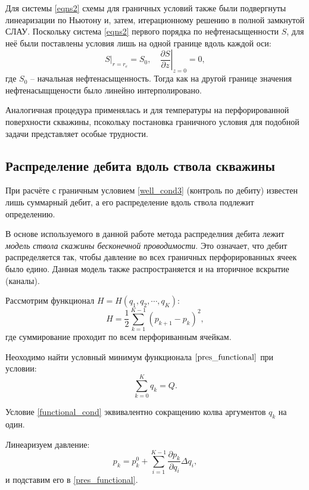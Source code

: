 	Для системы \eqref{eqns2} схемы для граничных условий также были подвергнуты линеаризации по Ньютону и, затем, итерационному решению в полной замкнутой СЛАУ.
	Поскольку система \eqref{eqns2} первого порядка по нефтенасыщенности $S$, для неё были поставлены условия лишь на одной границе вдоль каждой оси:
\begin{equation}
	\label{sat_bounds}
	\left.S\right|_{r=r_e} = S_0, \quad \left.\frac{\partial S}{\partial z}\right|_{z = 0} = 0,
\end{equation}
	где $S_0$ -- начальная нефтенасыщенность. Тогда как на другой границе значения нефтенасыщщености было линейно интерполировано.
	
	Аналогичная процедура применялась и для температуры на перфорированной поверхности скважины,  псокольку постановка граничного условия для подобной задачи представляет особые трудности.


\subsection{Распределение дебита вдоль ствола скважины}
	При расчёте с граничным условием \eqref{well_cond3} (контроль по дебиту) известен лишь суммарный дебит, а его распределение вдоль ствола подлежит определению.
	
	В основе используемого в данной работе метода распределния дебита лежит \textit{модель ствола скажины бесконечной проводимости}. 
	Это означает, что дебит распределяется так, чтобы давление во всех граничных перфорированных ячеек было едино.	
	Данная модель также распространяется и на вторичное вскрытие (каналы).

	Рассмотрим функционал $H = H(q_1, q_2, \cdots, q_K)$:
\begin{equation}
	\label{pres_functional}
	H = \frac{1}{2}\sum\limits_{k=1}^{K-1}\left(p_{k+1}-p_k\right)^2,
\end{equation}
	где суммирование проходит по всем перфориванным ячейкам.
	
	Неоходимо найти условный минимум функционала $\eqref{pres_functional}$ при условии:
\begin{equation}
	\label{functional_cond}
	\sum\limits_{k=0}^{K} q_k = Q.
\end{equation}
	
	Условие \eqref{functional_cond} эквивалентно сокращению колва аргументов $q_k$ на один.

	Линеаризуем давление:
\begin{equation}
	\label{press_linear}
	p_k = p_k^0 + \sum\limits_{i=1}^{K-1}\frac{\partial p_k}{\partial q_i}\Delta q_i,
\end{equation}
	и подставим его в \eqref{pres_functional}.

